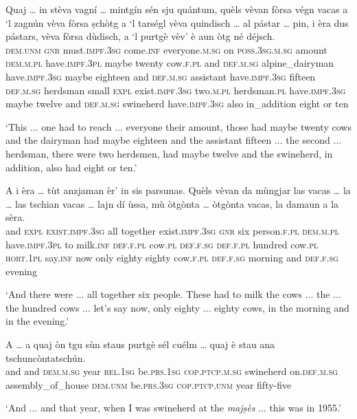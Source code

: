 \begin{linenumbers}
	\gll Quaj … in stèva vagní … mintgín sén sju quántum, quèls vèvan fòrsa végn vacas a `l zagnún vèva fòrsa ṣchòtg a `l tarségl vèva quindisch … al pástar … pin, i èra dus pástars, vèva fòrsa dùdisch, a `l purtgè vèv’ è aun òtg né déjsch.   \\
	\textsc{dem.unm} {} \textsc{gnr} must.\textsc{impf.3sg} come.\textsc{inf} {} everyone.\textsc{m.sg} on \textsc{poss.3sg.m.sg} amount \textsc{dem.m.pl} have.\textsc{impf.3pl} maybe twenty cow.\textsc{f.pl} and \textsc{def.m.sg} alpine\_dairyman have.\textsc{impf.3sg} maybe eighteen and \textsc{def.m.sg} assistant have.\textsc{impf.3sg} fifteen {} \textsc{def.m.sg} herdsman {} small \textsc{expl} exist.\textsc{impf.3sg} two.\textsc{m.pl} herdsman.\textsc{pl} have.\textsc{impf.3sg} maybe twelve and \textsc{def.m.sg} swineherd have.\textsc{impf.3sg} also in\_addition eight or ten\\
\end{linenumbers}
\medskip
\glt `This ... one had to reach ... everyone their amount, those had maybe twenty cows and the dairyman had maybe eighteen and the assistant fifteen ... the second ... herdsman, there were two herdsmen, had maybe twelve and the swineherd, in addition, also had eight or ten.'
\medskip

\begin{linenumbers}
	\gll   A i èra … tùt anzjaman èr’ in sis parsunas. Quèls vèvan da mùngjar las vacas … la … las tschian vacas … lajn dí ùssa, mù òtgònta … òtgònta vacas, la damaun a la sèra. \\
	and \textsc{expl} \textsc{exist.impf.3sg} {} all together exist.\textsc{impf.3sg} \textsc{gnr} six person.\textsc{f.pl} \textsc{dem.m.pl} have.\textsc{impf.3pl} to milk.\textsc{inf} \textsc{def.f.pl} cow.\textsc{pl} {} \textsc{def.f.sg} {} \textsc{def.f.pl} hundred cow.\textsc{pl} {}  \textsc{hort.1pl} say.\textsc{inf} now only eighty {} eighty cow.\textsc{f.pl} \textsc{def.f.sg} morning and \textsc{def.f.sg} evening\\
\end{linenumbers}
\medskip
\glt `And there were ... all together six people. These had to milk the cows ... the ... the hundred cows ... let's say now, only eighty ... eighty cows, in the morning and in the evening.'
\medskip

\begin{linenumbers}
	\gll A … a quaj òn tgu sùn staus purtgè sél cuélm … quaj è stau ana
	 tschuncòntatschún.\\
and {} and \textsc{dem.m.sg} year \textsc{rel.1sg} be.\textsc{prs.1sg} 	 \textsc{cop.ptcp.m.sg} swineherd on.\textsc{def.m.sg} assembly\_of\_house {} \textsc{dem.unm} be.\textsc{prs.3sg} \textsc{cop.ptcp.unm} year fifty-five\\
	\end{linenumbers}
\medskip
	 \glt `And ... and that year, when I was swineherd at the \textit{majṣès} ... this was in 1955.'
\medskip
	

